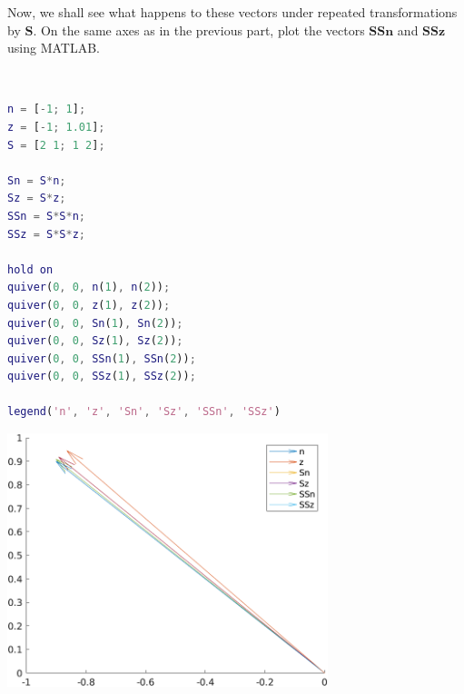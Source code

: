 Now, we shall see what happens to these vectors under repeated transformations by $\boldsymbol{S}$. On the same axes as in the previous part, plot the vectors $\boldsymbol{SSn}$ and $\boldsymbol{SSz}$ using MATLAB.

\begin{solution} \
    \begin{lstlisting}[language=Matlab]
n = [-1; 1];
z = [-1; 1.01];
S = [2 1; 1 2];

Sn = S*n;
Sz = S*z;
SSn = S*S*n;
SSz = S*S*z;

hold on
quiver(0, 0, n(1), n(2));
quiver(0, 0, z(1), z(2));
quiver(0, 0, Sn(1), Sn(2));
quiver(0, 0, Sz(1), Sz(2));
quiver(0, 0, SSn(1), SSn(2));
quiver(0, 0, SSz(1), SSz(2));

legend('n', 'z', 'Sn', 'Sz', 'SSn', 'SSz')
    \end{lstlisting}
    \begin{center}
        \includegraphics[width=0.7\textwidth]{img/e8p3.png}
    \end{center}
\end{solution}